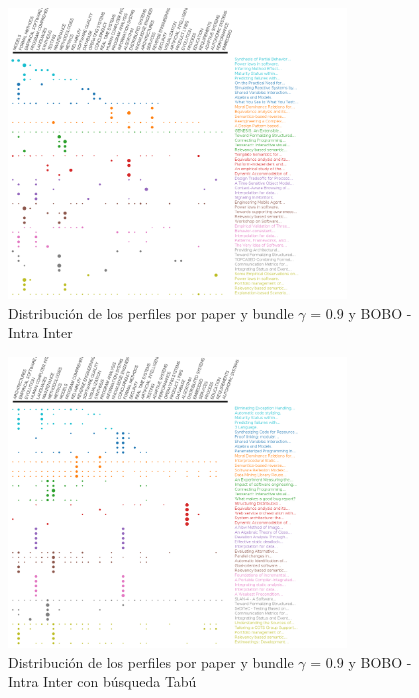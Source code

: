 \begin{figure}[H]
  \centering
    \includegraphics[width=0.8\textwidth]{resultados/papers/BOBO/INTRA_INTER/gamma-09.png}
  \caption{Distribución de los perfiles por paper y bundle $\gamma$ = $0.9$ y BOBO - Intra Inter}
  \label{res:img-papers-gamma09-bobo-intra-inter}
\end{figure}

\begin{figure}[H]
  \centering
    \includegraphics[width=0.8\textwidth]{resultados/papers/BOBO/INTRA_INTER/gamma-with-local-09.png}
  \caption{Distribución de los perfiles por paper y bundle $\gamma$ = $0.9$ y BOBO - Intra Inter con búsqueda Tabú}
  \label{res:img-papers-gamma09-bobo-intra-inter-tabu}
\end{figure}

